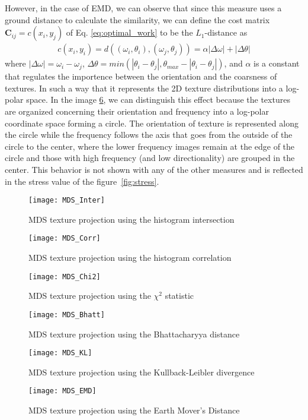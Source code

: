 However, in the case of EMD, we can observe that since this measure uses a ground distance to calculate the similarity, we can define the cost matrix $\mathbf{C}_{ij} = c(x_i, y_j)$ of Eq. \ref{eq:optimal_work} to be the $L_1$-distance as
\begin{eqnarray} 
 c(x_i, y_i) = d((\omega_i, \theta_i), (\omega_j, \theta_j))=\alpha|\Delta \omega| + |\Delta \theta| \label{eq:ground_distance}
\end{eqnarray}
where $|\Delta \omega| = \omega_i - \omega_j$, $\Delta \theta=min(|\theta_i-\theta_j|, \theta_{max} - |\theta_i-\theta_j|)$, and $\alpha$ is a constant that regulates the importence between the orientation and the coarsness of textures. In such a way that it represents the 2D texture distributions into a log-polar space. 
In the image \ref{fig:MDS_EMD}, we can distinguish this effect because the textures are organized concerning their orientation and frequency into a log-polar coordinate space forming a circle. The orientation of texture is represented along the circle while the frequency follows the axis that goes from the outside of the circle to the center, where the lower frequency images remain at the edge of the circle and those with high frequency (and low directionality) are grouped in the center. This behavior is not shown with any of the other measures and is reflected in the stress value of the figure~\ref{fig:stress}.

\begin{figure}[!ht]
 \centering    
 \texttt{[image: MDS\_Inter]}
 \caption{MDS texture projection using the histogram intersection}
 \label{fig:MDS_Inter} 
\end{figure}

\begin{figure}[!ht]
 \centering    
 \texttt{[image: MDS\_Corr]}
 \caption{MDS texture projection using the histogram correlation}
 \label{fig:MDS_Corr} 
\end{figure}

\begin{figure}[!ht]
 \centering    
 \texttt{[image: MDS\_Chi2]}
 \caption{MDS texture projection using the $\chi^2$ statistic}
 \label{fig:MDS_Chi2} 
\end{figure}

\begin{figure}[!ht]
 \centering    
 \texttt{[image: MDS\_Bhatt]}
 \caption{MDS texture projection using the Bhattacharyya distance}
 \label{fig:MDS_Bhatt} 
\end{figure}

\begin{figure}[!ht]
 \centering    
 \texttt{[image: MDS\_KL]}
 \caption{MDS texture projection using the Kullback-Leibler divergence}
 \label{fig:MDS_KL} 
\end{figure}

\begin{figure}[!ht]
 \centering    
 \texttt{[image: MDS\_EMD]}
 \caption{MDS texture projection using the Earth Mover's Distance}
 \label{fig:MDS_EMD} 
\end{figure}